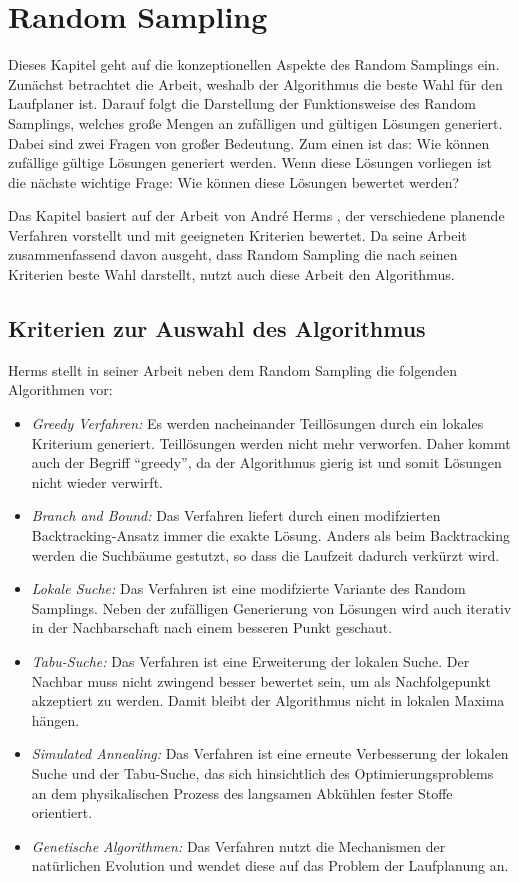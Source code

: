 \chapter{Random Sampling}

Dieses Kapitel geht auf die konzeptionellen Aspekte des Random Samplings ein. Zunächst betrachtet die Arbeit, weshalb der Algorithmus die beste Wahl für den Laufplaner ist. Darauf folgt die Darstellung der Funktionsweise des Random Samplings, welches große Mengen an zufälligen und gültigen Lösungen generiert.  Dabei sind zwei Fragen von großer Bedeutung. Zum einen ist das: Wie können zufällige gültige Lösungen generiert werden. Wenn diese Lösungen vorliegen ist die nächste wichtige Frage: Wie können diese Lösungen bewertet werden?

Das Kapitel basiert auf der Arbeit von André Herms \autocite{herms2004}, der verschiedene planende Verfahren vorstellt und mit geeigneten Kriterien bewertet. Da seine Arbeit zusammenfassend davon ausgeht, dass Random Sampling die nach seinen Kriterien beste Wahl darstellt, nutzt auch diese Arbeit den Algorithmus.

\section{Kriterien zur Auswahl des Algorithmus}

Herms stellt in seiner Arbeit neben dem Random Sampling die folgenden Algorithmen vor:
\begin{itemize}
  \item \emph{Greedy Verfahren:} Es werden nacheinander Teillösungen durch ein lokales Kriterium generiert. Teillösungen werden nicht mehr verworfen. Daher kommt auch der Begriff "`greedy"', da der Algorithmus gierig ist und somit Lösungen nicht wieder verwirft.
  \item \emph{Branch and Bound:} Das Verfahren liefert durch einen modifzierten Backtracking-Ansatz immer die exakte Lösung. Anders als beim Backtracking werden die Suchbäume gestutzt, so dass die Laufzeit dadurch verkürzt wird.
  \item \emph{Lokale Suche:} Das Verfahren ist eine modifzierte Variante des Random Samplings. Neben der zufälligen Generierung von Lösungen wird auch iterativ in der Nachbarschaft nach einem besseren Punkt geschaut.
  \item \emph{Tabu-Suche:} Das Verfahren ist eine Erweiterung der lokalen Suche. Der Nachbar muss nicht zwingend besser bewertet sein, um als Nachfolgepunkt akzeptiert zu werden. Damit bleibt der Algorithmus nicht in lokalen Maxima hängen.
  \item \emph{Simulated Annealing:} Das Verfahren ist eine erneute Verbesserung der lokalen Suche und der Tabu-Suche, das sich hinsichtlich des Optimierungsproblems an dem physikalischen Prozess des langsamen Abkühlen fester Stoffe orientiert.
  \item \emph{Genetische Algorithmen:} Das Verfahren nutzt die Mechanismen der natürlichen Evolution und wendet diese auf das Problem der Laufplanung an.
\end{itemize}

